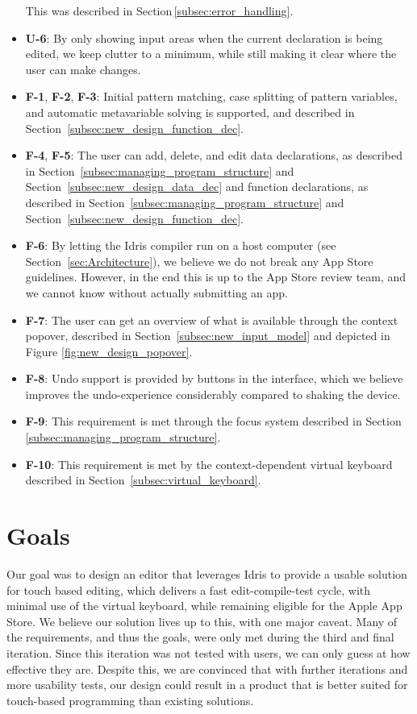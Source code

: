 \begin{itemize}
This was described in Section\,\ref{subsec:error_handling}.
\item \textbf{U-6}: By only showing input areas when the current declaration is being edited, we keep clutter to a minimum, while still making it clear where the user can make changes.
\item \textbf{F-1}, \textbf{F-2}, \textbf{F-3}: Initial pattern matching, case splitting of pattern variables, and automatic metavariable solving is supported, and described in Section~\ref{subsec:new_design_function_dec}.
\item \textbf{F-4}, \textbf{F-5}: The user can add, delete, and edit data declarations, as described in Section~\ref{subsec:managing_program_structure} and Section~\ref{subsec:new_design_data_dec}
and function declarations, as described in Section~\ref{subsec:managing_program_structure} and Section~\ref{subsec:new_design_function_dec}.
\item \textbf{F-6}: By letting the Idris compiler run on a host computer (see Section~\ref{sec:Architecture}), we believe we do not break any App Store guidelines. However, in the end this is up to the App Store review team, and we cannot know without actually submitting an app.
\item \textbf{F-7}: The user can get an overview of what is available through the context popover, described in Section~\ref{subsec:new_input_model}
and depicted in Figure \ref{fig:new_design_popover}.
\item \textbf{F-8}: Undo support is provided by buttons in the interface, which we believe improves the undo-experience considerably
compared to shaking the device.
\item \textbf{F-9}: This requirement is met through the focus system described in Section
\ref{subsec:managing_program_structure}.
\item \textbf{F-10}: This requirement is met by the context-dependent virtual keyboard described in Section~\ref{subsec:virtual_keyboard}.

\end{itemize}

\section{Goals}
Our goal was to design an editor that leverages Idris to provide a usable solution for touch based editing, which delivers a fast edit-compile-test cycle, with minimal use of the virtual keyboard, while remaining eligible for the Apple App Store.
We believe our solution lives up to this, with one major caveat. Many of the requirements, and thus the goals, were only met during the third and final iteration.
Since this iteration was not tested with users, we can only guess at how effective they are.
Despite this, we are convinced that with further iterations and more usability tests, our design could result in a product that is better suited for touch-based programming than existing solutions.

